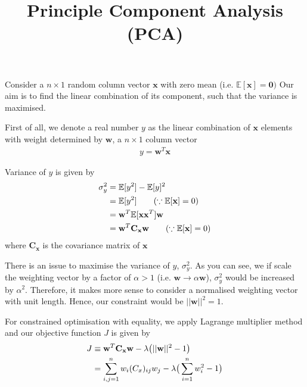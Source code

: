 \documentclass{article}
\begin{document}

\title{Principle Component Analysis (PCA)}

\maketitle

Consider a $n \times 1$ random column vector $\mathbf{x}$ with zero mean (i.e. $\mathbb{E}[\mathbf{x}] = \mathbf{0})$ Our aim is to find the linear combination of its component, such that the variance is maximised.


First of all, we denote a real number $y$ as the linear combination of $\mathbf{x}$ elements with weight determined by $\mathbf{w}$, a $n \times 1$ column vector
\begin{align}
    y = \mathbf{w}^{T}\mathbf{x}
\end{align}

Variance of $y$ is given by
\begin{align}
    \sigma_{y}^{2} &= \mathbb{E}[y^{2}] - \mathbb{E}[y]^{2} \notag \\
    &= \mathbb{E}[y^{2}] \qquad (\because \mathbb{E}[\mathbf{x}] = 0) \notag \\
    &= \mathbf{w}^{T}\mathbb{E}[\mathbf{x}\mathbf{x}^{T}] \mathbf{w} \notag \\
    &= \mathbf{w}^{T}\mathbf{C_{x}}\mathbf{w} \qquad  (\because \mathbb{E}[\mathbf{x}] = 0) 
\end{align}
where $\mathbf{C_{x}}$ is the covariance matrix of $\mathbf{x}$

There is an issue to maximise the variance of $y$, $\sigma_{y}^{2}$. As you can see, we if scale the weighting vector by a factor of $\alpha > 1$ (i.e. $\mathbf{w} \to \alpha \mathbf{w}$), $\sigma_{y}^{2}$ would be increased by $\alpha^{2}$. Therefore, it makes more sense to consider a normalised weighting vector with unit length. Hence, our constraint would be $||\mathbf{w} ||^{2} = 1$.

For constrained optimisation with equality, we apply Lagrange multiplier method and our objective function $J$ is given by
\begin{align}
    J &\equiv  \mathbf{w}^{T}\mathbf{C_{x}}\mathbf{w} - \lambda \big(||\mathbf{w} ||^{2} - 1\big) \notag \\
     &= \sum_{i, j=1}^{n} w_{i} (C_{x})_{ij} w_{j} - \lambda \big( \sum_{i=1}^{n} w_{i}^{2} - 1 \big)
\end{align}
\end{document}
